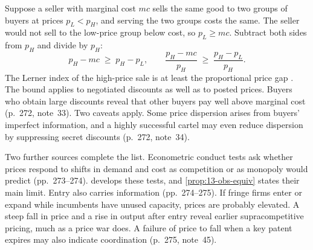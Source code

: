 \begin{remark}\label{rem:13-discrimination-bound}
Suppose a seller with marginal cost $mc$ sells the same good to two groups of buyers at prices $p_L < p_H$, and
serving the two groups costs the same. The seller would not sell to the low-price group below cost, so
$p_L \geq mc$. Subtract both sides from $p_H$ and divide by $p_H$:
\begin{equation*}
  p_H - mc \;\geq\; p_H - p_L , \qquad \frac{p_H - mc}{p_H} \;\geq\; \frac{p_H - p_L}{p_H} .
\end{equation*}
The Lerner index of the high-price sale is at least the proportional price gap \citep[pp.~271--272]{Kaplow2013}.
The bound applies to negotiated discounts as well as to posted prices. Buyers who obtain large discounts reveal that
other buyers pay well above marginal cost (p.~272, note~33). Two caveats apply. Some price dispersion arises from
buyers' imperfect information, and a highly successful cartel may even reduce dispersion by suppressing secret
discounts (p.~272, note~34).
\end{remark}

Two further sources complete the list. Econometric conduct tests ask whether prices respond to shifts in demand
and cost as competition or as monopoly would predict (pp.~273--274).  develops these tests, and
\cref{prop:13-obs-equiv} states their main limit. Entry also carries information (pp.~274--275). If fringe firms
enter or expand while incumbents have unused capacity, prices are probably elevated. A steep fall in price and a
rise in output after entry reveal earlier supracompetitive pricing, much as a price war does. A failure of price to
fall when a key patent expires may also indicate coordination (p.~275, note~45).

